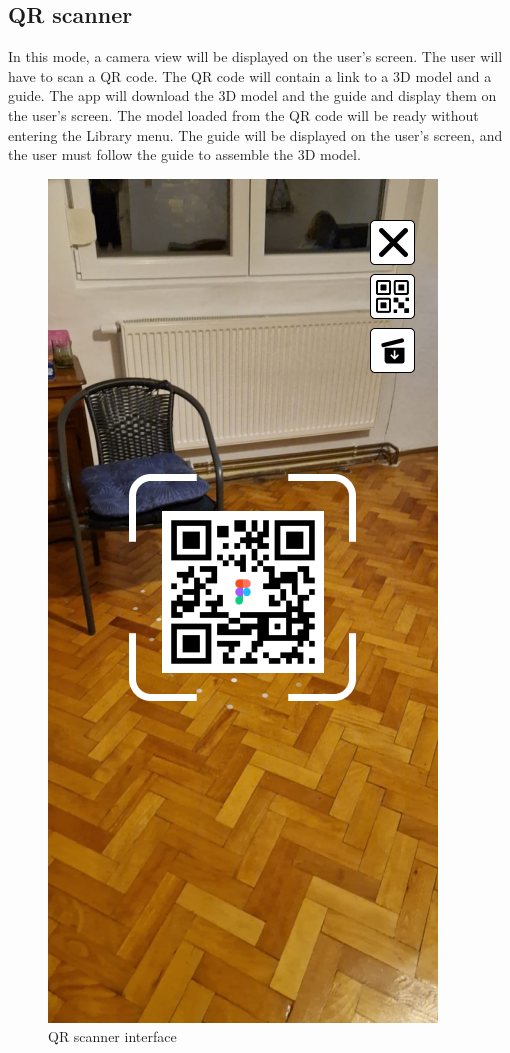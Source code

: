 \subsection{QR scanner}
In this mode, a camera view will be displayed on the user's screen. The user will have to scan a QR code. The QR code will contain a link to a 3D model and a guide. The app will download the 3D model and the guide and display them on the user's screen. The model loaded from the QR code will be ready without entering the Library menu. The guide will be displayed on the user's screen, and the user must follow the guide to assemble the 3D model.

\begin{figure}[h!]
    \begin{center}
        \includegraphics[scale=0.5]{img/App_mock/iPhone 14 - 3.png}
        \caption{QR scanner interface}
        \label{fig:qr-scanner}
    \end{center}
\end{figure}
\pagebreak


